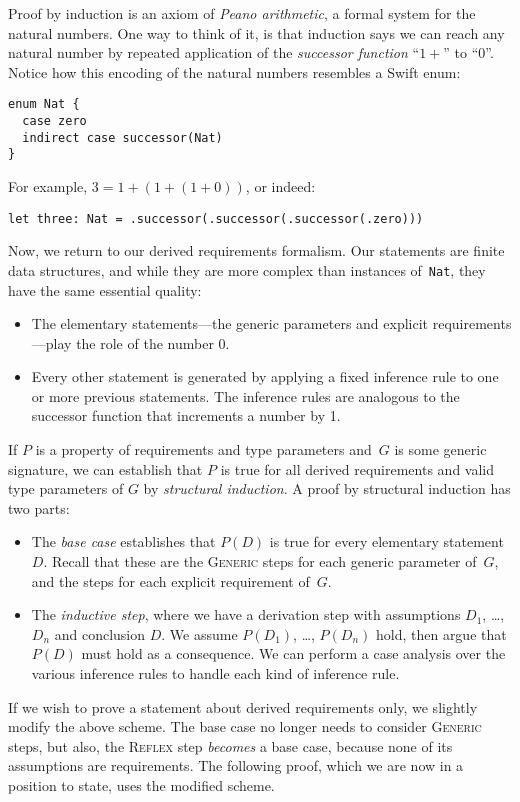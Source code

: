 \documentclass[../generics]{subfiles}
\begin{document}
Proof by induction is an axiom of \emph{Peano arithmetic}, a formal system for the natural numbers. One way to think of it, is that induction says we can reach any natural number by repeated application of the \emph{successor function} ``$1+{}$'' to ``0''. Notice how this encoding of the natural numbers resembles a Swift enum:
\begin{Verbatim}
enum Nat {
  case zero
  indirect case successor(Nat)
}
\end{Verbatim}
For example, $3=1+(1+(1+0))$, or indeed:
\begin{Verbatim}
let three: Nat = .successor(.successor(.successor(.zero)))
\end{Verbatim}
Now, we return to our derived requirements formalism. Our statements are finite data structures, and while they are more complex than instances of~\texttt{Nat}, they have the same essential quality:
\begin{itemize}
\item The elementary statements---the generic parameters and explicit requirements---play the role of the number 0.
\item Every other statement is generated by applying a fixed inference rule to one or more previous statements. The inference rules are analogous to the successor function that increments a number by 1.
\end{itemize}
If $P$ is a property of requirements and type parameters and~$G$ is some generic signature, we can establish that $P$ is true for all derived requirements and valid type parameters of $G$ by \emph{structural induction}. A proof by structural induction has two parts:
\begin{itemize}
\item The \emph{base case} establishes that $P(D)$ is true for every elementary statement $D$. Recall that these are the \textsc{Generic} steps for each generic parameter of~$G$, and the steps for each explicit requirement of~$G$.
\item The \emph{inductive step}, where we have a derivation step with assumptions $D_1$, \ldots, $D_n$ and conclusion $D$. We assume $P(D_1)$, \ldots, $P(D_n)$ hold, then argue that $P(D)$ must hold as a consequence. We can perform a case analysis over the various inference rules to handle each kind of inference rule.
\end{itemize}
If we wish to prove a statement about derived requirements only, we slightly modify the above scheme. The base case no longer needs to consider \textsc{Generic} steps, but also, the \textsc{Reflex} step \emph{becomes} a base case, because none of its assumptions are requirements. The following proof, which we are now in a position to state, uses the modified scheme.
\end{document}
